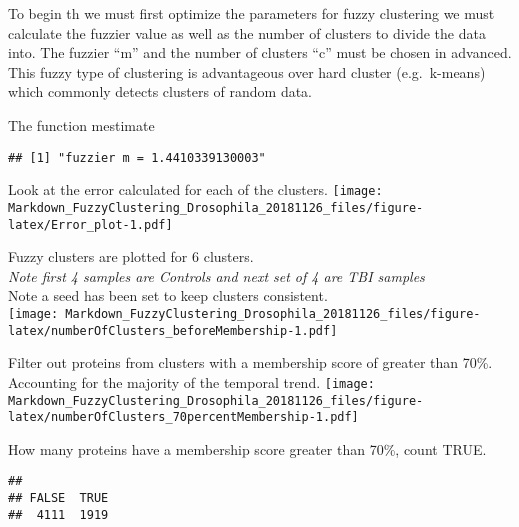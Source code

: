\documentclass[]{article}
\newenvironment{Shaded}{\begin{snugshade}}{\end{snugshade}}
\newcommand{\KeywordTok}[1]{\textcolor[rgb]{0.13,0.29,0.53}{\textbf{#1}}}
\newcommand{\DataTypeTok}[1]{\textcolor[rgb]{0.13,0.29,0.53}{#1}}
\newcommand{\DecValTok}[1]{\textcolor[rgb]{0.00,0.00,0.81}{#1}}
\newcommand{\StringTok}[1]{\textcolor[rgb]{0.31,0.60,0.02}{#1}}
\newcommand{\CommentTok}[1]{\textcolor[rgb]{0.56,0.35,0.01}{\textit{#1}}}
\newcommand{\ControlFlowTok}[1]{\textcolor[rgb]{0.13,0.29,0.53}{\textbf{#1}}}
\newcommand{\OperatorTok}[1]{\textcolor[rgb]{0.81,0.36,0.00}{\textbf{#1}}}
\newcommand{\NormalTok}[1]{#1}
\begin{document}
To begin th we must first optimize the parameters for fuzzy clustering
we must calculate the fuzzier value as well as the number of clusters to
divide the data into. The fuzzier ``m'' and the number of clusters ``c''
must be chosen in advanced. This fuzzy type of clustering is
advantageous over hard cluster (e.g.~k-means) which commonly detects
clusters of random data.

The function mestimate

\begin{verbatim}
## [1] "fuzzier m = 1.4410339130003"
\end{verbatim}

\begin{Shaded}
\end{Shaded}

Look at the error calculated for each of the clusters.
\texttt{[image: Markdown\_FuzzyClustering\_Drosophila\_20181126\_files/figure-latex/Error\_plot-1.pdf]}

Fuzzy clusters are plotted for 6 clusters.\\
\emph{Note first 4 samples are Controls and next set of 4 are TBI
samples\\
}Note a seed has been set to keep clusters consistent.\\
\texttt{[image: Markdown\_FuzzyClustering\_Drosophila\_20181126\_files/figure-latex/numberOfClusters\_beforeMembership-1.pdf]}

Filter out proteins from clusters with a membership score of greater
than 70\%. Accounting for the majority of the temporal trend.
\texttt{[image: Markdown\_FuzzyClustering\_Drosophila\_20181126\_files/figure-latex/numberOfClusters\_70percentMembership-1.pdf]}

How many proteins have a membership score greater than 70\%, count TRUE.

\begin{verbatim}
## 
## FALSE  TRUE 
##  4111  1919
\end{verbatim}
\end{document}
